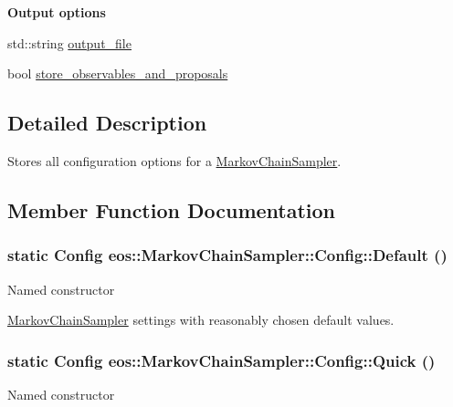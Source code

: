 \begin{Indent}{\bf Output options}\par
{\em \label{_amgrpa3beb290cb264578f0ef293e44984365}
 }\begin{DoxyCompactItemize}
\item 
std::string \hyperlink{classeos_1_1MarkovChainSampler_1_1Config_a09fb2c6eeddd6bdde3ac5de54f63433f}{output\_\-file}
\item 
bool \hyperlink{classeos_1_1MarkovChainSampler_1_1Config_aeeea2452cd313ebe9a695c98bdeceeee}{store\_\-observables\_\-and\_\-proposals}
\end{DoxyCompactItemize}
\end{Indent}


\subsection{Detailed Description}
Stores all configuration options for a \hyperlink{classeos_1_1MarkovChainSampler}{MarkovChainSampler}. 

\subsection{Member Function Documentation}
\hypertarget{classeos_1_1MarkovChainSampler_1_1Config_a873df585d161c55e45b69fe45def8bd0}{
\subsubsection[{Default}]{\setlength{\rightskip}{0pt plus 5cm}static {\bf Config} eos::MarkovChainSampler::Config::Default ()}}
\label{classeos_1_1MarkovChainSampler_1_1Config_a873df585d161c55e45b69fe45def8bd0}
Named constructor

\hyperlink{classeos_1_1MarkovChainSampler}{MarkovChainSampler} settings with reasonably chosen default values. \hypertarget{classeos_1_1MarkovChainSampler_1_1Config_aae4d353bed05e0921697290e7e93f116}{
\subsubsection[{Quick}]{\setlength{\rightskip}{0pt plus 5cm}static {\bf Config} eos::MarkovChainSampler::Config::Quick ()}}
\label{classeos_1_1MarkovChainSampler_1_1Config_aae4d353bed05e0921697290e7e93f116}
Named constructor

